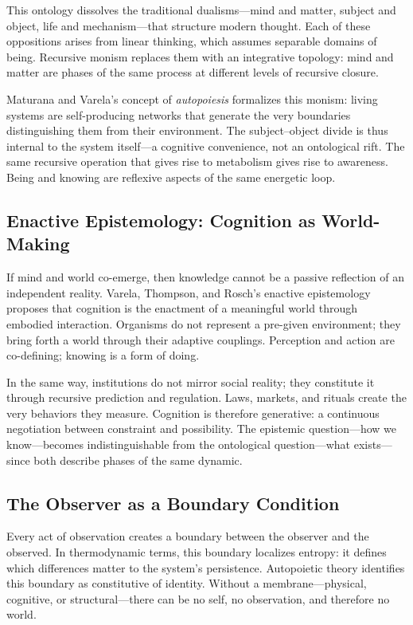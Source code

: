 \documentclass[11pt,a4paper]{article}
\begin{document}
This ontology dissolves the traditional dualisms—mind and matter, subject and object, life and mechanism—that structure modern thought.  Each of these oppositions arises from linear thinking, which assumes separable domains of being.  Recursive monism replaces them with an integrative topology: mind and matter are phases of the same process at different levels of recursive closure.

Maturana and Varela’s concept of \emph{autopoiesis} \citep{MaturanaVarela1980Autopoiesis} formalizes this monism: living systems are self-producing networks that generate the very boundaries distinguishing them from their environment.  The subject–object divide is thus internal to the system itself—a cognitive convenience, not an ontological rift.  The same recursive operation that gives rise to metabolism gives rise to awareness.  Being and knowing are reflexive aspects of the same energetic loop.

\subsection{Enactive Epistemology: Cognition as World-Making}

If mind and world co-emerge, then knowledge cannot be a passive reflection of an independent reality.  Varela, Thompson, and Rosch’s enactive epistemology \citep{VarelaThompsonRosch1991EmbodiedMind} proposes that cognition is the enactment of a meaningful world through embodied interaction.  Organisms do not represent a pre-given environment; they bring forth a world through their adaptive couplings.  Perception and action are co-defining; knowing is a form of doing.

In the same way, institutions do not mirror social reality; they constitute it through recursive prediction and regulation.  Laws, markets, and rituals create the very behaviors they measure.  Cognition is therefore generative: a continuous negotiation between constraint and possibility.  The epistemic question—how we know—becomes indistinguishable from the ontological question—what exists—since both describe phases of the same dynamic.

\subsection{The Observer as a Boundary Condition}

Every act of observation creates a boundary between the observer and the observed.  In thermodynamic terms, this boundary localizes entropy: it defines which differences matter to the system’s persistence.  Autopoietic theory identifies this boundary as constitutive of identity.  Without a membrane—physical, cognitive, or structural—there can be no self, no observation, and therefore no world.
\end{document}
